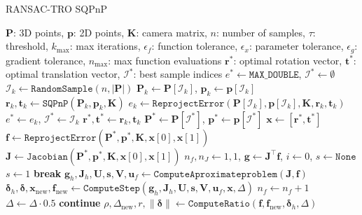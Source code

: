 \documentclass[a4paper,fleqn]{cas-sc}
\begin{document}
\begin{algorithm}
	\caption{RANSAC-TRO SQPnP}
	\begin{algorithmic}[1]
		\REQUIRE $\mathbf{P}$: 3D points, $\mathbf{p}$: 2D points, $\mathbf{K}$: camera matrix, $n$: number of samples, $\tau$: threshold, $k_{\max}$: max iterations, $\epsilon_f$: function tolerance, $\epsilon_x$: parameter tolerance, $\epsilon_g$: gradient tolerance, $n_{\max}$: max function evaluations
		\ENSURE $\mathbf{r}^*$: optimal rotation vector, $\mathbf{t}^*$: optimal translation vector, $\mathcal{I}^*$: best sample indices
		\STATE $e^* \gets \texttt{MAX\_DOUBLE}$, $\mathcal{I}^* \gets \emptyset$
		\STATE $\mathcal{I}_k \gets \texttt{RandomSample}(n, |\mathbf{P}|)$
		\STATE $\mathbf{P}_k \gets \mathbf{P}[\mathcal{I}_k]$, $\mathbf{p}_k \gets \mathbf{p}[\mathcal{I}_k]$
		\STATE $\mathbf{r}_k, \mathbf{t}_k \gets \texttt{SQPnP}(\mathbf{P}_k, \mathbf{p}_k, \mathbf{K})$
		\STATE $e_k \gets \texttt{ReprojectError}(\mathbf{P}[\mathcal{I}_k], \mathbf{p}[\mathcal{I}_k], \mathbf{K}, \mathbf{r}_k, \mathbf{t}_k)$
		\STATE $e^* \gets e_k$, $\mathcal{I}^* \gets \mathcal{I}_k$
		\STATE $\mathbf{r}^*, \mathbf{t}^* \gets \mathbf{r}_k, \mathbf{t}_k$
		\ENDIF
		\ENDFOR
		\STATE $\mathbf{P}^* \gets \mathbf{P}[\mathcal{I}^*]$, $\mathbf{p}^* \gets \mathbf{p}[\mathcal{I}^*]$
		\STATE $\mathbf{x} \gets [\mathbf{r}^*, \mathbf{t}^*]$
		\STATE $\mathbf{f} \gets \texttt{ReprojectError}(\mathbf{P}^*, \mathbf{p}^*, \mathbf{K}, \mathbf{x}[0], \mathbf{x}[1])$
		\STATE $\mathbf{J} \gets \texttt{Jacobian}(\mathbf{P}^*, \mathbf{p}^*, \mathbf{K}, \mathbf{x}[0], \mathbf{x}[1])$
		\STATE $n_f, n_J \gets 1, 1$, $\mathbf{g} \gets \mathbf{J}^\top \mathbf{f}$, $i \gets 0$, $s \gets \texttt{None}$
		\STATE $s \gets 1$
		\STATE \textbf{break}
		\ENDIF
		\STATE $\mathbf{g}_h, \mathbf{J}_h, \mathbf{U}, \mathbf{s}, \mathbf{V}, \mathbf{u}_f \gets \texttt{ComputeAproximateproblem}(\mathbf{J}, \mathbf{f})$
		\STATE $\boldsymbol{\delta}_h, \boldsymbol{\delta}, \mathbf{x}_{\text{new}}, \mathbf{f}_{\text{new}} \gets \texttt{ComputeStep}(\mathbf{g}_h, \mathbf{J}_h, \mathbf{U}, \mathbf{s}, \mathbf{V}, \mathbf{u}_f, \mathbf{x}, \Delta)$
		\STATE $n_f \gets n_f + 1$
		\STATE $\Delta \gets \Delta \cdot 0.5$
		\STATE \textbf{continue}
		\ENDIF
		\STATE $\rho, \Delta_{\text{new}}, r, \|\boldsymbol{\delta}\| \gets \texttt{ComputeRatio}(\mathbf{f}, \mathbf{f}_{\text{new}}, \boldsymbol{\delta}_h, \Delta)$

\end{algorithmic}
\end{algorithm}
\end{document}
